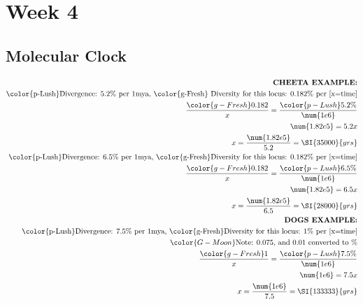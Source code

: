 \documentclass[12pt,a4paper]{article}
\begin{document}





\clearpage
\section*{Week 4}
{}

\subsection{Molecular Clock}
\begin{align*}
    \textbf{CHEETA EXAMPLE:}\\
    \text{{\color{p-Lush}Divergence: 5.2\%} per 1mya, {\color{g-Fresh} Diversity for this locus: 0.182\%} per [x=time]}\\
    \frac{{\color{g-Fresh}0.182}}{x} = \frac{{\color{p-Lush}5.2\%}}{\num{1e6}}\\
    \num{1.82e5}= 5.2x\\
    x = \frac{\num{1.82e5}}{5.2} = \SI{35000}{yrs}\\ 
    \text{{\color{p-Lush}Divergence: 6.5\%} per 1mya, {\color{g-Fresh}Diversity for this locus: 0.182\%} per [x=time]}\\
    \frac{{\color{g-Fresh}0.182}}{x} = \frac{{\color{p-Lush}6.5\%}}{\num{1e6}}\\
    \num{1.82e5}= 6.5x\\
    x = \frac{\num{1.82e5}}{6.5} = \SI{28000}{yrs}\\ 
    \textbf{DOGS EXAMPLE:}\\
    \text{{\color{p-Lush}Divergence: 7.5\%} per 1mya, {\color{g-Fresh}Diversity for this locus: 1\%} per [x=time]}\\
    {\color{G-Moon}\text{Note: 0.075, and 0.01 converted to \%}}\\
    \frac{{\color{g-Fresh}1}}{x} = \frac{{\color{p-Lush}7.5\%}}{\num{1e6}}\\
    \num{1e6}= 7.5x\\
    x = \frac{\num{1e6}}{7.5} = \SI{133333}{yrs}\\
\end{align*}

\newpage
{}
\end{document}
